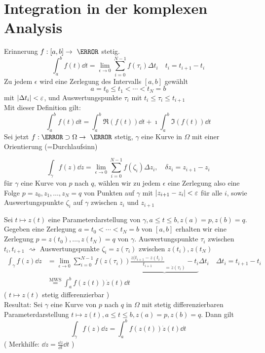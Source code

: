 \chapter{Integration in der komplexen Analysis}
Erinnerung $f: [a,b] \rightarrow \C$ stetig.
\[ \int_a^b f(t) \dd t = \lim_{\epsilon \rightarrow 0} \sum_{i = 0}^{N-1} f( \tau_i ) \Delta t_i \quad t_i = t_{i+1} - t_i \]
Zu jedem $\epsilon$ wird eine Zerlegung des Intervalls $[a,b]$ gewählt
\[ a = t_0 \leq t_1 < \dotsb < t_N = b \]
mit $\abs{\Delta t_i} <\varepsilon$, und Auswertungspunkte $\tau_i$ mit $t_i \leq \tau_i \leq t_{i+1}$ \\
Mit dieser Definition gilt:
\[ \int_a^b f(t) \dd t = \int_a^b \Re( f(t) ) \dd t + \imath \int_a^b \Im( f(t) ) \dd t \]
Sei jetzt $f: \C \supset \Omega \rightarrow \C$ stetig, $\gamma$ eine Kurve in $\Omega$ mit einer Orientierung (=Durchlaufsinn) \\
\begin{def*}
	\[ \int_\gamma f(z) \dd z = \lim_{\epsilon \rightarrow 0} \sum_{i = 0}^{N-1} f(\zeta_i) \Delta z_i , \quad \delta z_i = z_{i+1} - z_i \]
	für $\gamma$ eine Kurve von $p$ nach $q$, wählen wir zu jedem $\epsilon$ eine Zerlegung also eine Folge $p = z_0 , z_1 , \dotsc , z_N = q$ von Punkten auf $\gamma$ mit $\abs{z_{i+1} - z_i} < \varepsilon$ für alle $i$, sowie Auswertungspunkte $\zeta_i$ auf $\gamma$ zwischen $z_i$ und $z_{i+1}$
\end{def*}
Sei $t \mapsto z(t)$ eine Parameterdarstellung von $\gamma, a \leq t \leq b, z(a) = p , z(b) = q$. Gegeben eine Zerlegung $a = t_0 < \dotsb < t_N = b$ von $[a,b]$ erhalten wir eine Zerlegung $p = z(t_0) , \dotsc , z(t_N) = q$ von $\gamma$. Auswertungspunkte $\tau_i$ zwischen $t_i , t_{i+1}$ $\rightsquigarrow$ Auswertungspunkte $\zeta_i = z(\tau_i)$ zwischen $z(t_i) , z(t_N)$
\[ \begin{split}
	\int_\gamma f(z) \dd z	&= \lim_{\epsilon \rightarrow 0} \sum_{i = 0}^{N-1} f(z(\tau_i)) \underbrace{\frac{z(t_{i+1} - z(t_i)}{t_{i+1}}_{=\dot{z}(\tau_i)} - t_i} \Delta t_i \quad \Delta t_i = t_{i+1} - t_i \\
						&\overset{\text{MWS}}{=} \int_a^b f(z(t)) \dot{z}(t) \dd t
\end{split} \]
( $t \mapsto z(t)$ stetig differenzierbar ) \\
Resultat: Sei $\gamma$ eine Kurve von $p$ nach $q$ in $\Omega$ mit stetig differenzierbaren Parameterdarstellung $t \mapsto z(t) , a \leq t \leq b , z(a) = p , z(b) = q$. Dann gilt
\[ \int_\gamma f(z) \dd z = \int_a^b f(z(t)) \dot{z}(t) \dd t \]
( Merkhilfe: $\dd z = \frac{\dd z}{\dd t} \dd t$ ) \\
